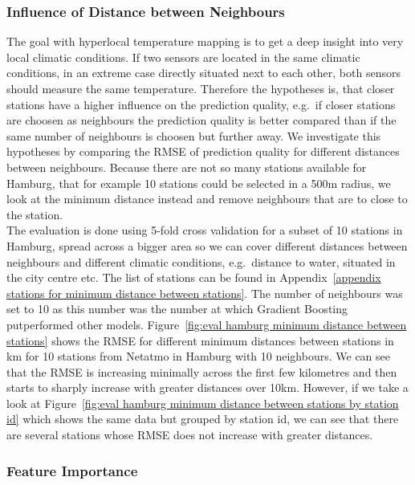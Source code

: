\subsubsection{Influence of Distance between Neighbours}

The goal with hyperlocal temperature mapping is to get a deep insight into very local climatic conditions. If two sensors are located in the same climatic conditions, in an extreme case directly situated next to each other, both sensors should measure the same temperature. Therefore the hypotheses is, that closer stations have a higher influence on the prediction quality, e.g.\ if closer stations are choosen as neighbours the prediction quality is better compared than if the same number of neighbours is choosen but further away. We investigate this hypotheses by comparing the RMSE of prediction quality for different distances between neighbours. Because there are not so many stations available for Hamburg, that for example 10 stations could be selected in a 500m radius, we look at the minimum distance instead and remove neighbours that are to close to the station.\\
The evaluation is done using 5-fold cross validation for a subset of 10 stations in Hamburg, spread across a bigger area so we can cover different distances between neighbours and different climatic conditions, e.g.\ distance to water, situated in the city centre etc. The list of stations can be found in Appendix~\ref{appendix stations for minimum distance between stations}. The number of neighbours was set to 10 as this number was the number at which Gradient Boosting putperformed other models. Figure~\ref{fig:eval hamburg minimum distance between stations} shows the RMSE for different minimum distances between stations in km for 10 stations from Netatmo in Hamburg with 10 neighbours. We can see that the RMSE is increasing minimally across the first few kilometres and then starts to sharply increase with greater distances over 10km. However, if we take a look at Figure~\ref{fig:eval hamburg minimum distance between stations by station id} which shows the same data but grouped by station id, we can see that there are several stations whose RMSE does not increase with greater distances.\\ %

\subsubsection{Feature Importance}

